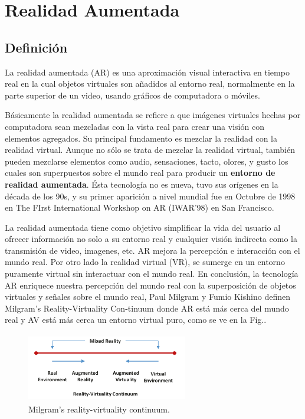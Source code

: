 \newpage
\section{Realidad Aumentada}
\setcounter{secnumdepth}{2}

\subsection{Definición}
La realidad aumentada (AR) es una aproximación visual interactiva en tiempo real en la cual objetos virtuales son añadidos al entorno real, normalmente en la parte superior de un video, usando gráficos de computadora o móviles.\cite{B04} \par
Básicamente la realidad aumentada se refiere a que imágenes virtuales hechas por computadora sean mezcladas con la vista real para crear una visión con elementos agregados. Su principal fundamento es mezclar la realidad con la realidad virtual. Aunque no sólo se trata de mezclar la realidad virtual, también pueden mezclarse elementos como audio, sensaciones, tacto, olores, y gusto los cuales son superpuestos sobre el mundo real para producir un \textbf{entorno de realidad aumentada}.\cite{B05}
Ésta tecnología no es nueva, tuvo sus orígenes en la década de los 90s\cite{B04}, y su primer aparición a nivel mundial fue en Octubre de 1998 en The FIrst International Workshop on AR (IWAR'98) en San Francisco\cite{B05}.\par
La realidad aumentada tiene como objetivo simplificar la vida del usuario al ofrecer información no solo a su entorno real y cualquier visión indirecta como la transmisión de video, imagenes, etc. AR mejora la percepción e interacción con el mundo real. Por otro lado la realidad virtual (VR), se sumerge en un entorno puramente virtual sin interactuar con el mundo real. En conclusión, la tecnología AR enriquece nuestra percepción del mundo real con la superposición de objetos virtuales y señales sobre el mundo real, Paul Milgram y Fumio Kishino definen Milgram’s Reality-Virtuality Con-tinuum donde AR está más cerca del mundo real y AV está más cerca un entorno virtual puro, como se ve en la Fig.\cite{BXX}.\par
\begin{figure}[h!]
	\centering
	\includegraphics[width=7cm,height=3cm]{imagenes/marcoteorico/ar/metaversecontinuum.png}
	\caption{Milgram’s reality-virtuality continuum.\cite{BXX}}
	\label{fig:analogo}
\end{figure}

